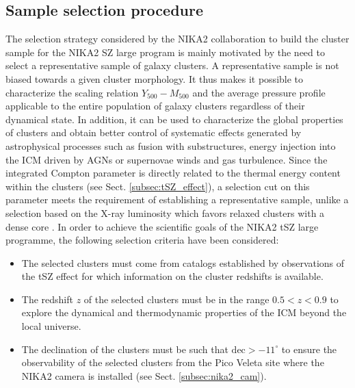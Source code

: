 \documentclass[twocolumn,traditabstract]{aa}
\begin{document}
\subsection{Sample selection procedure}\label{subsec:sample_select}

The selection strategy considered by the NIKA2 collaboration to build the cluster sample for the NIKA2 SZ large program is mainly motivated by the need to select a representative sample of galaxy clusters. A representative sample is not biased towards a given cluster morphology. It thus makes it possible to characterize the scaling relation $Y_{500}{-}M_{500}$ and the average pressure profile applicable to the entire population of galaxy clusters regardless of their dynamical state. In addition, it can be used to characterize the global properties of clusters and obtain better control of systematic effects generated by astrophysical processes such as fusion with substructures, energy injection into the ICM driven by AGNs or supernovae winds and gas turbulence. Since the integrated Compton parameter is directly related to the thermal energy content within the clusters (see Sect. \ref{subsec:tSZ_effect}), a selection cut on this parameter meets the requirement of establishing a representative sample, unlike a selection based on the X-ray luminosity which favors relaxed clusters with a dense core \citep{ros17}. In order to achieve the scientific goals of the NIKA2 tSZ large programme, the following selection criteria have been considered:

\begin{itemize}
\item The selected clusters must come from catalogs established by observations of the tSZ effect for which information on the cluster redshifts is available.\\
\item The redshift $z$ of the selected clusters must be in the range $0.5 < z < 0.9$ to explore the dynamical and thermodynamic properties of the ICM beyond the local universe.\\
\item The declination of the clusters must be such that $\mathrm{dec} > -11^{\circ}$ to ensure the observability of the selected clusters from the Pico Veleta site where the NIKA2 camera is installed (see Sect. \ref{subsec:nika2_cam}).\\
\end{itemize}
\end{document}

